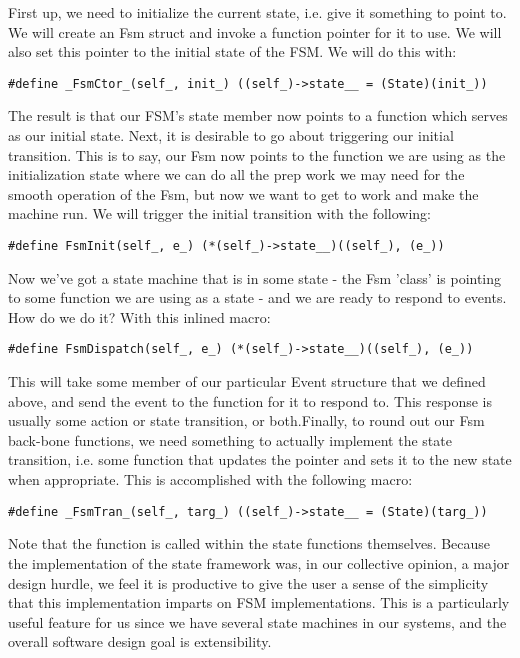 First up, we need to initialize the current state, i.e. give it something to point to. We will create an Fsm struct and invoke a function pointer for it to use. We will also set this pointer to the initial state of the FSM. We will do this with:

\begin{lstlisting}
#define _FsmCtor_(self_, init_) ((self_)->state__ = (State)(init_))
\end{lstlisting}
The result is that our FSM's state member now points to a function which serves as our initial state. Next, it is desirable to go about triggering our initial transition. This is to say, our Fsm now points to the function we are using as the initialization state where we can do all the prep work we may need for the smooth operation of the Fsm, but now we want to get to work and make the machine run. We will trigger the initial transition with the following:

\begin{lstlisting}
#define FsmInit(self_, e_) (*(self_)->state__)((self_), (e_))
\end{lstlisting}

Now we've got a state machine that is in some state - the Fsm 'class' is pointing to some function we are using as a state - and we are ready to respond to events. How do we do it? With this inlined macro:

\begin{lstlisting}
#define FsmDispatch(self_, e_) (*(self_)->state__)((self_), (e_))
\end{lstlisting}


This will take some member of our particular Event structure that we defined above, and send the event to the function for it to respond to. This response is usually some action or state transition, or both.Finally, to round out our Fsm back-bone functions, we need something to actually implement the state transition, i.e. some function that updates the pointer and sets it to the new state when appropriate. This is accomplished with the following macro:
\begin{lstlisting}
#define _FsmTran_(self_, targ_) ((self_)->state__ = (State)(targ_))
\end{lstlisting}
Note that the function is called within the state functions themselves. Because the implementation of the state framework was, in our collective opinion, a major design hurdle, we feel it is productive to give the user a sense of the simplicity that this implementation imparts on FSM implementations. This is a particularly useful feature for us since we have several state machines in our systems, and the overall software design goal is extensibility.  

